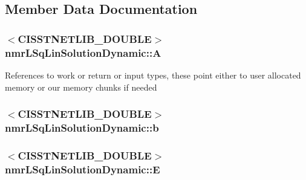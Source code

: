 \subsection{Member Data Documentation}
\hypertarget{classnmr_l_sq_lin_solution_dynamic_aa4a41abac141e2e55dd5cafb59169dfd}{}
\subsubsection[{A}]{$<$C\+I\+S\+S\+T\+N\+E\+T\+L\+I\+B\+\_\+\+D\+O\+U\+B\+L\+E$>$ nmr\+L\+Sq\+Lin\+Solution\+Dynamic\+::\+A\hspace{0.3cm}{\ttfamily [protected]}}\label{classnmr_l_sq_lin_solution_dynamic_aa4a41abac141e2e55dd5cafb59169dfd}
References to work or return or input types, these point either to user allocated memory or our memory chunks if needed \hypertarget{classnmr_l_sq_lin_solution_dynamic_a38efbfac59be113b58fd8a23cf543e5f}{}
\subsubsection[{b}]{$<$C\+I\+S\+S\+T\+N\+E\+T\+L\+I\+B\+\_\+\+D\+O\+U\+B\+L\+E$>$ nmr\+L\+Sq\+Lin\+Solution\+Dynamic\+::b\hspace{0.3cm}{\ttfamily [protected]}}\label{classnmr_l_sq_lin_solution_dynamic_a38efbfac59be113b58fd8a23cf543e5f}
\hypertarget{classnmr_l_sq_lin_solution_dynamic_a7c1ac112b07f3edd33d348fe0a40fb71}{}
\subsubsection[{E}]{$<$C\+I\+S\+S\+T\+N\+E\+T\+L\+I\+B\+\_\+\+D\+O\+U\+B\+L\+E$>$ nmr\+L\+Sq\+Lin\+Solution\+Dynamic\+::\+E\hspace{0.3cm}{\ttfamily [protected]}}\label{classnmr_l_sq_lin_solution_dynamic_a7c1ac112b07f3edd33d348fe0a40fb71}
\hypertarget{classnmr_l_sq_lin_solution_dynamic_a218e6ab273eb85a0bc7d44560c5d6b4f}{}
